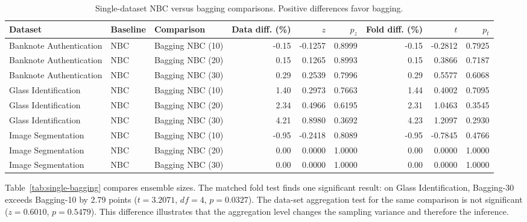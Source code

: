 \documentclass[11pt]{article}
\begin{document}
\begin{table}[H]
\centering
\scriptsize
\caption{Single-dataset NBC versus bagging comparisons. Positive differences favor bagging.}
\label{tab:single-nbc}
\setlength{\tabcolsep}{3pt}
\begin{tabular}{lllrrrrrr}
\toprule
Dataset & Baseline & Comparison & Data diff. (\%) & $z$ & $p_z$ & Fold diff. (\%) & $t$ & $p_t$ \\
\midrule
Banknote Authentication & NBC & Bagging NBC (10) & -0.15 & -0.1257 & 0.8999 & -0.15 & -0.2812 & 0.7925 \\
Banknote Authentication & NBC & Bagging NBC (20) & 0.15 & 0.1265 & 0.8993 & 0.15 & 0.3866 & 0.7187 \\
Banknote Authentication & NBC & Bagging NBC (30) & 0.29 & 0.2539 & 0.7996 & 0.29 & 0.5577 & 0.6068 \\
Glass Identification & NBC & Bagging NBC (10) & 1.40 & 0.2973 & 0.7663 & 1.44 & 0.4002 & 0.7095 \\
Glass Identification & NBC & Bagging NBC (20) & 2.34 & 0.4966 & 0.6195 & 2.31 & 1.0463 & 0.3545 \\
Glass Identification & NBC & Bagging NBC (30) & 4.21 & 0.8980 & 0.3692 & 4.23 & 1.2097 & 0.2930 \\
Image Segmentation & NBC & Bagging NBC (10) & -0.95 & -0.2418 & 0.8089 & -0.95 & -0.7845 & 0.4766 \\
Image Segmentation & NBC & Bagging NBC (20) & 0.00 & 0.0000 & 1.0000 & 0.00 & 0.0000 & 1.0000 \\
Image Segmentation & NBC & Bagging NBC (30) & 0.00 & 0.0000 & 1.0000 & 0.00 & 0.0000 & 1.0000 \\
\bottomrule
\end{tabular}
\end{table}

Table~\ref{tab:single-bagging} compares ensemble sizes. The matched fold test finds one significant result: on Glass Identification, Bagging-30 exceeds Bagging-10 by 2.79 points ($t=3.2071$, $df=4$, $p=0.0327$). The data-set aggregation test for the same comparison is not significant ($z=0.6010$, $p=0.5479$). This difference illustrates that the aggregation level changes the sampling variance and therefore the inference.
\end{document}
